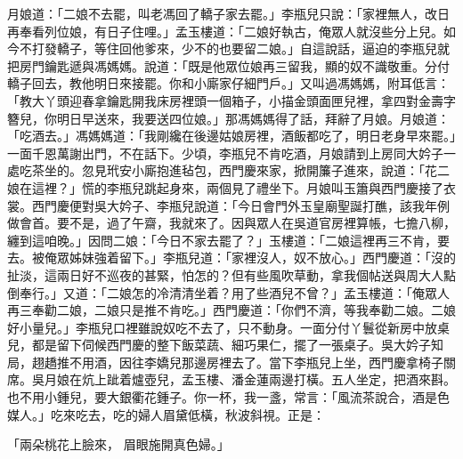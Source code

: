 \begin{showcontents}{}
月娘道：「二娘不去罷，叫老馮回了轎子家去罷。」李瓶兒只說：「家裡無人，改日再奉看列位娘，有日子住哩。」孟玉樓道：「二娘好執古，俺眾人就沒些分上兒。如今不打發轎子，等住回他爹來，少不的也要留二娘。」自這說話，逼迫的李瓶兒就把房門鑰匙遞與馮媽媽。說道：「既是他眾位娘再三留我，顯的奴不識敬重。分付轎子回去，教他明日來接罷。你和小廝家仔細門戶。」又叫過馮媽媽，附耳低言：「教大丫頭迎春拿鑰匙開我床房裡頭一個箱子，小描金頭面匣兒裡，拿四對金壽字簪兒，你明日早送來，我要送四位娘。」那馮媽媽得了話，拜辭了月娘。月娘道：「吃酒去。」馮媽媽道：「我剛纔在後邊姑娘房裡，酒飯都吃了，明日老身早來罷。」一面千恩萬謝出門，不在話下。少頃，李瓶兒不肯吃酒，月娘請到上房同大妗子一處吃茶坐的。忽見玳安小廝抱進毡包，西門慶來家，掀開簾子進來，說道：「花二娘在這裡？」慌的李瓶兒跳起身來，兩個見了禮坐下。月娘叫玉簫與西門慶接了衣裳。西門慶便對吳大妗子、李瓶兒說道：「今日會門外玉皇廟聖誕打醮，該我年例做會首。要不是，過了午齋，我就來了。因與眾人在吳道官房裡算帳，七擔八柳，纏到這咱晚。」因問二娘：「今日不家去罷了？」玉樓道：「二娘這裡再三不肯，要去。被俺眾姊妹強着留下。」李瓶兒道：「家裡沒人，奴不放心。」西門慶道：「沒的扯淡，這兩日好不巡夜的甚緊，怕怎的？但有些風吹草動，拿我個帖送與周大人點倒奉行。」又道：「二娘怎的冷清清坐着？用了些酒兒不曾？」孟玉樓道：「俺眾人再三奉勸二娘，二娘只是推不肯吃。」西門慶道：「你們不濟，等我奉勸二娘。二娘好小量兒。」李瓶兒口裡雖說奴吃不去了，只不動身。一面分付丫鬟從新房中放桌兒，都是留下伺候西門慶的整下飯菜蔬、細巧果仁，擺了一張桌子。吳大妗子知局，趐趫推不用酒，因往李嬌兒那邊房裡去了。當下李瓶兒上坐，西門慶拿椅子關席。吳月娘在炕上跐着爐壺兒，孟玉樓、潘金蓮兩邊打橫。五人坐定，把酒來斟。也不用小鍾兒，要大銀衢花鍾子。你一杯，我一盞，常言：「風流茶說合，酒是色媒人。」吃來吃去，吃的婦人眉黛低橫，秋波斜視。正是：

「兩朵桃花上臉來，  眉眼施開真色婦。」


\end{showcontents}
